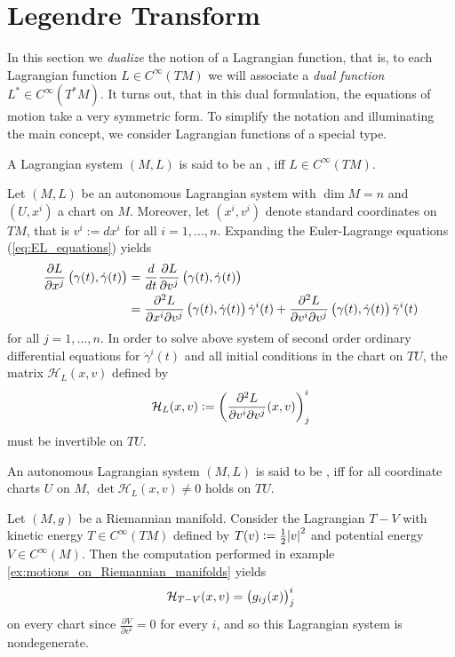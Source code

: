 \section*{Legendre Transform}
In this section we \emph{dualize} the notion of a Lagrangian function, that is, to each Lagrangian function $L \in C^\infty(TM)$ we will associate a \emph{dual function} $L^* \in C^\infty(T^*M)$. It turns out, that in this dual formulation, the equations of motion take a very symmetric form. To simplify the notation and illuminating the main concept, we consider Lagrangian functions of a special type.

\begin{definition}
	A Lagrangian system $(M,L)$ is said to be an , iff $L \in C^\infty(TM)$.
\end{definition}

Let $(M,L)$ be an autonomous Lagrangian system with $\dim M = n$ and $(U,x^i)$ a chart on $M$. Moreover, let $(x^i,v^i)$ denote standard coordinates on $TM$, that is $v^i := dx^i$ for all $i = 1,\dots,n$. Expanding the Euler-Lagrange equations (\ref{eq:EL_equations}) yields
\begin{align*}
	\frac{\partial L}{\partial x^j}\del[1]{\gamma(t),\dot{\gamma}(t)} &= \frac{d}{dt}\frac{\partial L}{\partial v^j}\del[1]{\gamma(t),\dot{\gamma}(t)}\\
	&= \frac{\partial^2 L}{\partial x^i\partial v^j}\del[1]{\gamma(t),\dot{\gamma}(t)}\dot{\gamma}^i(t) + \frac{\partial^2 L}{\partial v^i\partial v^j}\del[1]{\gamma(t),\dot{\gamma}(t)}\ddot{\gamma}^i(t)
\end{align*}
\noindent for all $j = 1,\dots,n$. In order to solve above system of second order ordinary differential equations for $\ddot{\gamma}^i(t)$ and all initial conditions in the chart on $TU$, the matrix $\mathcal{H}_L(x,v)$ defined by
\begin{equation}
	\label{eq:H_L}
	\mathcal{H}_L(x,v) := \del[3]{\frac{\partial^2 L}{\partial v^i\partial v^j}(x,v)}_j^i
\end{equation}
\noindent must be invertible on $TU$.

\begin{definition}
	An autonomous Lagrangian system $(M,L)$ is said to be , iff for all coordinate charts $U$ on $M$, $\det \mathcal{H}_L(x,v) \neq 0$ holds on $TU$. 
\end{definition}

\begin{example}
	\label{ex:nondegenerate_Lagrangian_system}
	Let $(M,g)$ be a Riemannian manifold. Consider the Lagrangian $T - V$ with kinetic energy $T \in C^\infty(TM)$ defined by $T(v) := \frac{1}{2}\abs{v}^2$ and potential energy $V \in C^\infty(M)$. Then the computation performed in example \ref{ex:motions_on_Riemannian_manifolds} yields
	\begin{equation*}
		\mathcal{H}_{T - V}(x,v) = \del[1]{g_{ij}(x)}^i_j
	\end{equation*} 
	\noindent on every chart since $\frac{\partial V}{\partial v^i} = 0$ for every $i$, and so this Lagrangian system is nondegenerate.
\end{example}

